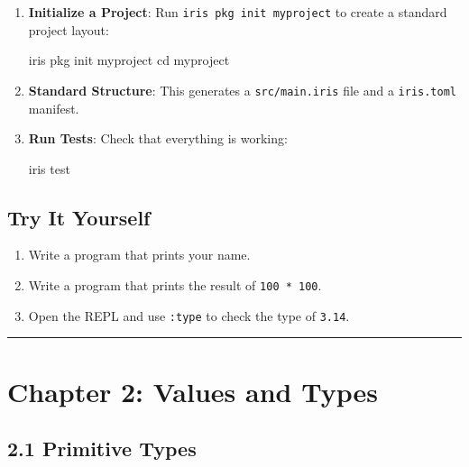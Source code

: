 \documentclass[
  english,
]{book}
\newenvironment{Shaded}{\begin{snugshade}}{\end{snugshade}}
\newcommand{\BuiltInTok}[1]{\textcolor[rgb]{0.83,0.83,0.83}{#1}}
\newcommand{\ExtensionTok}[1]{\textcolor[rgb]{0.83,0.83,0.83}{#1}}
\newcommand{\NormalTok}[1]{\textcolor[rgb]{0.83,0.83,0.83}{#1}}
\providecommand{\tightlist}{%
  \setlength{\itemsep}{0pt}\setlength{\parskip}{0pt}}
\begin{document}
\begin{enumerate}
\def\labelenumi{\arabic{enumi}.}
\item
  \textbf{Initialize a Project}: Run \texttt{iris\ pkg\ init\ myproject}
  to create a standard project layout:

\begin{Shaded}
\begin{Highlighting}[]
\ExtensionTok{iris}\NormalTok{ pkg init myproject}
\BuiltInTok{cd}\NormalTok{ myproject}
\end{Highlighting}
\end{Shaded}
\item
  \textbf{Standard Structure}: This generates a \texttt{src/main.iris}
  file and a \texttt{iris.toml} manifest.
\item
  \textbf{Run Tests}: Check that everything is working:

\begin{Shaded}
\begin{Highlighting}[]
\ExtensionTok{iris}\NormalTok{ test}
\end{Highlighting}
\end{Shaded}
\end{enumerate}

\subsection{Try It Yourself}\label{try-it-yourself}

\begin{enumerate}
\def\labelenumi{\arabic{enumi}.}
\tightlist
\item
  Write a program that prints your name.
\item
  Write a program that prints the result of \texttt{100\ *\ 100}.
\item
  Open the REPL and use \texttt{:type} to check the type of
  \texttt{3.14}.
\end{enumerate}

\begin{center}\rule{0.5\linewidth}{0.5pt}\end{center}

\section{Chapter 2: Values and Types}\label{chapter-2-values-and-types}

\subsection{2.1 Primitive Types}\label{primitive-types}
\end{document}
